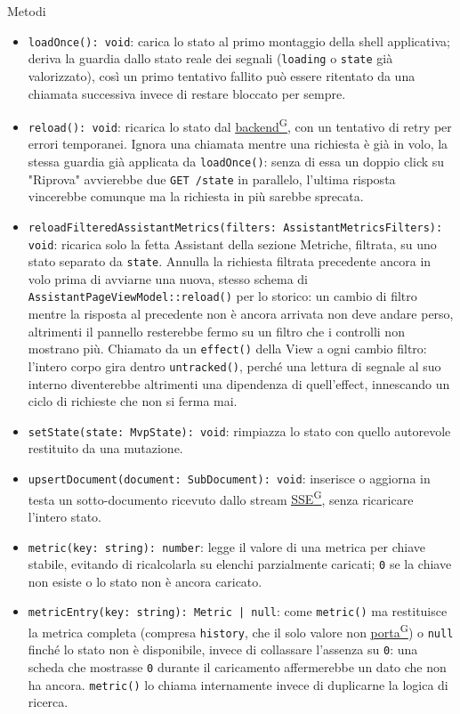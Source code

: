 \documentclass[a4paper,12pt]{article}
\providecommand{\glslink}[2]{\href{https://alittlebyte-19.github.io/Documentazione/glossario.html\#gls-#1}{\underline{#2}\textsuperscript{\scriptsize G}}}
\begin{document}
\begin{sloppypar}
Metodi
\begin{itemize}\raggedright
    \item \texttt{loadOnce(): void}: carica lo stato al primo montaggio della shell applicativa; deriva la guardia dallo stato reale dei segnali (\texttt{loading} o \texttt{state} già valorizzato), così un primo tentativo fallito può essere ritentato da una chiamata successiva invece di restare bloccato per sempre.
    \item \texttt{reload(): void}: ricarica lo stato dal \glslink{backend}{backend}, con un tentativo di retry per errori temporanei. Ignora una chiamata mentre una richiesta è già in volo, la stessa guardia già applicata da \texttt{loadOnce()}: senza di essa un doppio click su "Riprova" avvierebbe due \texttt{GET /state} in parallelo, l'ultima risposta vincerebbe comunque ma la richiesta in più sarebbe sprecata.
    \item \texttt{reloadFilteredAssistantMetrics(filters: AssistantMetricsFilters): void}: ricarica solo la fetta Assistant della sezione Metriche, filtrata, su uno stato separato da \texttt{state}. Annulla la richiesta filtrata precedente ancora in volo prima di avviarne una nuova, stesso schema di \texttt{AssistantPageViewModel::reload()} per lo storico: un cambio di filtro mentre la risposta al precedente non è ancora arrivata non deve andare perso, altrimenti il pannello resterebbe fermo su un filtro che i controlli non mostrano più. Chiamato da un \texttt{effect()} della View a ogni cambio filtro: l'intero corpo gira dentro \texttt{untracked()}, perché una lettura di segnale al suo interno diventerebbe altrimenti una dipendenza di quell'effect, innescando un ciclo di richieste che non si ferma mai.
    \item \texttt{setState(state: MvpState): void}: rimpiazza lo stato con quello autorevole restituito da una mutazione.
    \item \texttt{upsertDocument(document: SubDocument): void}: inserisce o aggiorna in testa un sotto-documento ricevuto dallo stream \glslink{sse-server-sent-events}{SSE}, senza ricaricare l'intero stato.
    \item \texttt{metric(key: string): number}: legge il valore di una metrica per chiave stabile, evitando di ricalcolarla su elenchi parzialmente caricati; \texttt{0} se la chiave non esiste o lo stato non è ancora caricato.
    \item \texttt{metricEntry(key: string): Metric | null}: come \texttt{metric()} ma restituisce la metrica completa (compresa \texttt{history}, che il solo valore non \glslink{porta}{porta}) o \texttt{null} finché lo stato non è disponibile, invece di collassare l'assenza su \texttt{0}: una scheda che mostrasse \texttt{0} durante il caricamento affermerebbe un dato che non ha ancora. \texttt{metric()} lo chiama internamente invece di duplicarne la logica di ricerca.
\end{itemize}


\end{sloppypar}
\end{document}
